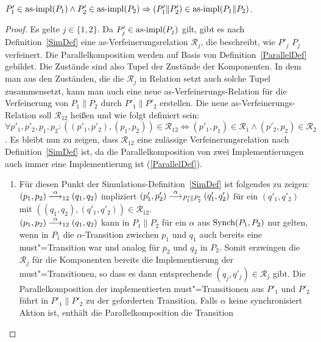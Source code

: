 \begin{Lem}\mbox{}\\
  \label{impParallelLem}
  $P'_1\in\mathrm{as}\text{-}\mathrm{impl} (P_1) \land P'_2 \in\mathrm{as}\text{-}\mathrm{impl} (P_2) \Rightarrow (P'_1\|P'_2)
  \in\mathrm{as}\text{-}\mathrm{impl} (P_1\|P_2)$.
\end{Lem}

\begin{proof}
  Es gelte $j\in\{1,2\}$. Da $P'_j\in\mathrm{as}\text{-}\mathrm{impl} (P_j)$ gilt, gibt es nach
  Definition~\ref{SimDef} eine as-Verfeinerungsrelation $\mathcal{R}_j$, die
  beschreibt, wie $P'_j$ $P_j$ verfeinert. Die Parallelkomposition werden
  auf Basis von Definition~\ref{ParallelDef} gebildet. Die Zustände sind also
  Tupel der Zustände der Komponenten. In dem man aus den Zuständen, die die
  $\mathcal{R}_j$ in Relation setzt auch solche Tupel zusammensetzt, kann man
  auch eine neue as-Verfeinerungs-Relation für die Verfeinerung von $P_1\|P_2$
  durch $P'_1\|P'_2$ erstellen. Die neue as-Verfeinerungs-Relation soll
  $\mathcal{R}_{12}$ heißen und wie folgt definiert sein:
  $\forall p'_1,p'_2,p_1,p_2: ((p'_1,p'_2),(p_1,p_2))\in\mathcal{R}_{12}
  \Leftrightarrow (p'_1,p_1)\in\mathcal{R}_1 \land (p'_2,p_2)\in\mathcal{R}_2$.
  Es bleibt nun zu zeigen, dass $\mathcal{R}_{12}$ eine zulässige
  Verfeinerungsrelation nach Definition~\ref{SimDef} ist, da die
  Parallelkomposition von zwei Implementierungen auch immer eine
  Implementierung ist (\ref{ParallelDef}).
  \begin{enumerate}
    \item Für diesen Punkt der Simulations-Definition~\ref{SimDef} ist
      folgendes zu zeigen: $(p_1,p_2)\must[\alpha]_{12}(q_1,q_2)$ impliziert
      $(p'_1,p'_2)\must[\alpha]_{P'_1\|P'_2}(q'_1,q'_2)$ für ein $(q'_1,q'_2)$
      mit $((q_1,q_2),(q'_1,q'_2))\in\mathcal{R}_{12}$.\\
      $(p_1,p_2)\must[\alpha]_{12}(q_1,q_2)$ kann in $P_1\|P_2$ für ein
      $\alpha$ aus $\mathrm{Synch} (P_1,P_2)$ nur gelten, wenn in $P_1$ die
      $\alpha$-Transition zwischen $p_1$ und $q_1$ auch bereits eine
      must"=Transition war und analog für $p_2$ und $q_2$ in $P_2$. Somit
      erzwingen die $\mathcal{R}_j$ für die Komponenten bereits die
      Implementierung der must"=Transitionen, so dass es dann entsprechende
      $(q_j,q'_j)\in\mathcal{R}_j$ gibt. Die Parallelkomposition der
      implementierten must"=Transitionen aus $P'_1$ und $P'_2$ führt in
      $P'_1\|P'_2$ zu der geforderten Transition. Falls $\alpha$ keine
      synchronisiert Aktion ist, enthält die Parallelkomposition die Transition

\end{enumerate}
\end{proof}
